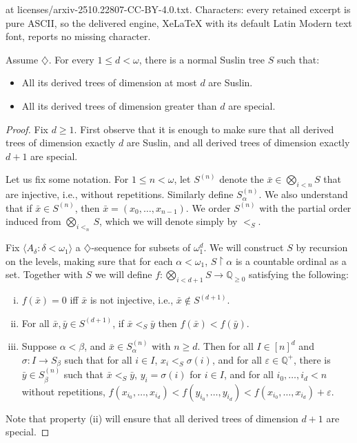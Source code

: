 \documentclass[10pt,a4paper]{amsart}
\newcommand{\Q}{\mathbb{Q}}
\newcommand{\res}{\restriction}
\newcommand{\tup}[1]{\langle#1\rangle}
\begin{document}
at licenses/arxiv-2510.22807-CC-BY-4.0.txt. Characters: every retained excerpt is pure ASCII, so the delivered engine, XeLaTeX with its default Latin Modern text font, reports no missing character.
\begin{theorem}\label{thm:diamond-S}
  Assume $\diamondsuit$. For every $1 \le d < \omega$,
  there is a normal Suslin tree
  $S$ such that:
  \begin{itemize}
    \item All its derived trees of dimension at most $d$ are
    Suslin.
    \item All its derived trees of dimension greater than $d$
    are special.
  \end{itemize}

\end{theorem}

\begin{proof}
  Fix $d \ge 1$. First observe  that it is enough to make sure that all derived
  trees of dimension exactly $d$ are Suslin, and all derived trees
  of dimension exactly $d+1$ are special.

  Let us fix some notation. For $1 \le n < \omega$, let
  $S^{(n)}$ denote the $\bar{x} \in \bigotimes_{i < n}S$ that
  are injective, i.e., without repetitions. Similarly
  define $S^{(n)}_{\alpha}$. We also understand that
  if $\bar{x} \in S^{(n)}$, then $\bar{x} = (x_{0},\dots,x_{n-1})$.
  We order $S^{(n)}$ with the partial order induced
  from $\bigotimes_{i<_{n}}S$, which we will denote simply
  by $<_{S}$.

  Fix $\tup{A_{\delta} : \delta < \omega_{1}}$ a $\diamondsuit$-sequence
  for subsets of $\omega_{1}^{d}$.
  We will construct $S$ by recursion on the levels, making
  sure that for each $\alpha < \omega_{1}$,
  $S\res \alpha$ is a countable ordinal as a set.
  Together with $S$ we will define
  $f : \bigotimes_{i < d+1}S \to \Q_{\ge 0}$ satisfying the following:
  \begin{enumerate}[(i)]
    \item $f(\bar{x}) = 0$ iff $\bar{x}$ is not injective, i.e.,
    $\bar{x} \notin S^{(d+1)}$.
    \item For all $\bar{x},\bar{y} \in S^{(d+1)}$,
    if $\bar{x} <_{S} \bar{y}$ then $f(\bar{x}) < f(\bar{y})$.
    \item Suppose $\alpha < \beta$, and
    $\bar{x} \in S_{\alpha}^{(n)}$ with $n \ge d$. Then for all
    $I \in [n]^{d}$ and $\sigma : I \to S_{\beta}$ such that
    for all $i \in I$, $x_{i} <_{S} \sigma(i)$, and for
    all $\varepsilon \in \Q^{+}$, there is
    $\bar{y} \in S_{\beta}^{(n)}$ such that $\bar{x} <_{S} \bar{y}$,
    $y_{i} = \sigma(i)$ for $i \in I$,
    and for all $i_{0},\dots,i_{d} < n$ without
    repetitions,
    $f(x_{i_{0}},\dots,x_{i_{d}}) < f(y_{i_{0}},\dots,y_{i_{d}})
    < f(x_{i_{0}},\dots,x_{i_{d}}) + \varepsilon$.
  \end{enumerate}
  Note that property (ii) will ensure that all derived trees of
  dimension $d+1$ are special.


\end{proof}
\end{document}
